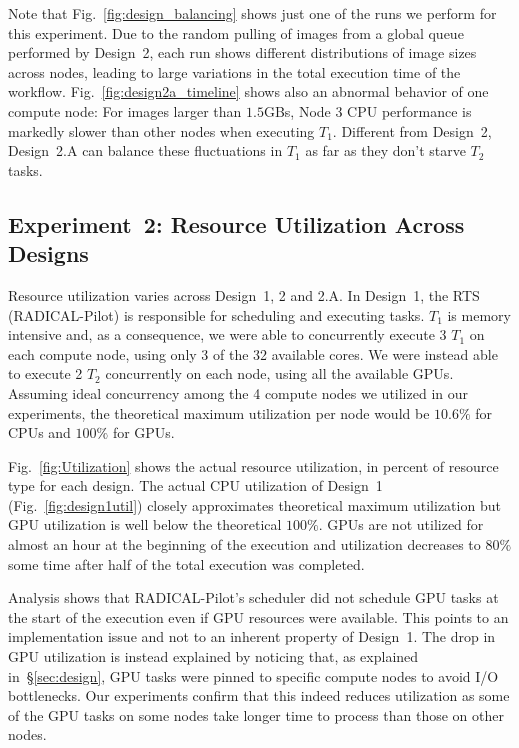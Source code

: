 Note that Fig.~\ref{fig:design_balancing} shows just one of the runs we 
perform for this experiment. Due to the random pulling of images from a global 
queue performed by Design~2, each run shows different distributions of image 
sizes across nodes, leading to large variations in the total execution time of 
the workflow. Fig.~\ref{fig:design2a_timeline} shows also an abnormal behavior 
of one compute node: For images larger than $1.5$GBs, Node 3 CPU performance 
is markedly slower than other nodes when executing $T_{1}$. Different from 
Design~2, Design~2.A can balance these fluctuations in $T_{1}$ as far as they 
don't starve $T_{2}$ tasks.

\subsection{Experiment~2: Resource Utilization Across Designs}\label{ssec:exp2}

Resource utilization varies across Design~1, 2 and 2.A. In Design~1, the RTS 
(RADICAL-Pilot) is responsible for scheduling and executing tasks. $T_{1}$ is 
memory intensive and, as a consequence, we were able to concurrently execute 3 
$T_{1}$ on each compute node, using only 3 of the 32 available cores. We were 
instead able to execute 2 $T_{2}$ concurrently on each node, using all the 
available GPUs. Assuming ideal concurrency among the 4 compute nodes we 
utilized in our experiments, the theoretical maximum utilization per node 
would be $10.6\%$ for CPUs and $100\%$ for GPUs.

Fig.~\ref{fig:Utilization} shows the actual resource utilization, in percent 
of resource type for each design. The actual CPU utilization of Design~1 
(Fig.~\ref{fig:design1util}) closely approximates theoretical maximum 
utilization but GPU utilization is well below the theoretical $100\%$. GPUs 
are not utilized for almost an hour at the beginning of the execution and 
utilization decreases to $80\%$ some time after half of the total execution 
was completed.

Analysis shows that RADICAL-Pilot's scheduler did not schedule GPU tasks at 
the start of the execution even if GPU resources were available. This points 
to an implementation issue and not to an inherent property of Design~1. The 
drop in GPU utilization is instead explained by noticing that, as explained 
in~\S\ref{sec:design}, GPU tasks were pinned to specific compute nodes to 
avoid I/O bottlenecks. Our experiments confirm that this indeed reduces 
utilization as some of the GPU tasks on some nodes take longer time to process 
than those on other nodes.

